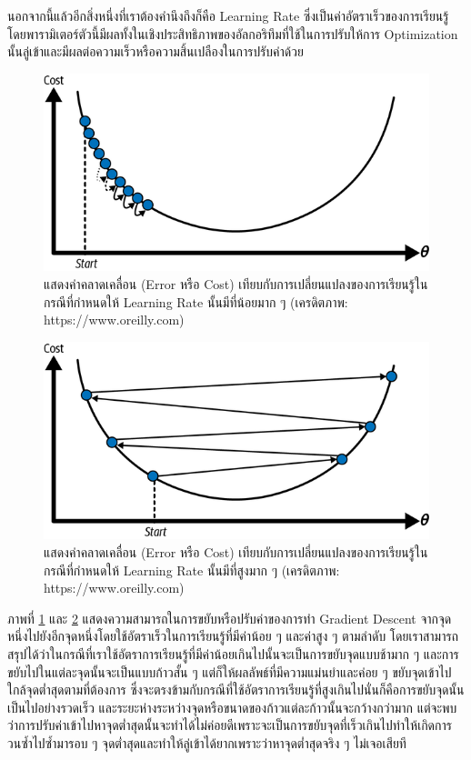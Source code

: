 นอกจากนี้แล้วอีกสิ่งหนึ่งที่เราต้องคำนึงถึงก็คือ Learning Rate ซึ่งเป็นค่าอัตราเร็วของการเรียนรู้ โดยพารามิเตอร์ตัวนี้มีผลทั้งในเชิงประสิทธิภาพของอัลกอริทึมที่ใช้ในการปรับให้การ Optimization นั้นลู่เข้าและมีผลต่อความเร็วหรือความสิ้นเปลืองในการปรับค่าด้วย

\begin{figure}[H]
    \centering
    \includegraphics[width=0.6\linewidth]{fig/learning_rate_small.png}
    \caption{แสดงค่าคลาดเคลื่อน (Error หรือ Cost) เทียบกับการเปลี่ยนแปลงของการเรียนรู้ในกรณีที่กำหนดให้ Learning Rate นั้นมีที่น้อยมาก ๆ (เครดิตภาพ: https://www.oreilly.com)}
    \label{fig:learning_rate_small}
\end{figure}

\begin{figure}[H]
    \centering
    \includegraphics[width=0.6\linewidth]{fig/learning_rate_high.png}
    \caption{แสดงค่าคลาดเคลื่อน (Error หรือ Cost) เทียบกับการเปลี่ยนแปลงของการเรียนรู้ในกรณีที่กำหนดให้ Learning Rate นั้นมีที่สูงมาก ๆ (เครดิตภาพ: https://www.oreilly.com)}
    \label{fig:learning_rate_high}
\end{figure}

ภาพที่ \ref{fig:learning_rate_small} และ \ref{fig:learning_rate_high} แสดงความสามารถในการขยับหรือปรับค่าของการทำ
Gradient Descent จากจุดหนึ่งไปยังอีกจุดหนึ่งโดยใช้อัตราเร็วในการเรียนรู้ที่มีค่าน้อย ๆ และค่าสูง ๆ ตามลำดับ โดยเราสามารถสรุปได้ว่าในกรณีที่เราใช้อัตราการเรียนรู้ที่มีค่าน้อยเกินไปนั้นจะเป็นการขยับจุดแบบช้ามาก ๆ และการขยับไปในแต่ละจุดนั้นจะเป็นแบบก้าวสั้น ๆ แต่ก็ให้ผลลัพธ์ที่มีความแม่นยำและค่อย ๆ ขยับจุดเข้าไปใกล้จุดต่ำสุดตามที่ต้องการ ซึ่งจะตรงข้ามกับกรณีที่ใช้อัตราการเรียนรู้ที่สูงเกินไปนั่นก็คือการขยับจุดนั้นเป็นไปอย่างรวดเร็ว และระยะห่างระหว่างจุดหรือขนาดของก้าวแต่ละก้าวนั้นจะกว้างกว่ามาก แต่จะพบว่าการปรับค่าเข้าไปหาจุดต่ำสุดนั้นจะทำได้ไม่ค่อยดีเพราะจะเป็นการขยับจุดที่เร็วเกินไปทำให้เกิดการวนซ้ำไปซ้ำมารอบ ๆ จุดต่ำสุดและทำให้ลู่เข้าได้ยากเพราะว่าหาจุดต่ำสุดจริง ๆ ไม่เจอเสียที

